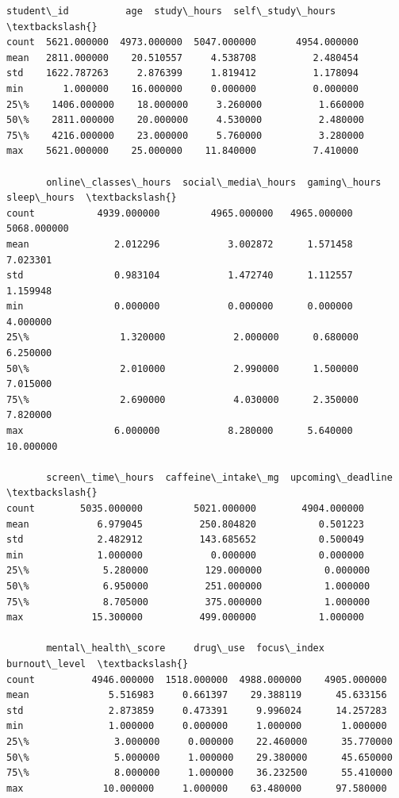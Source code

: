 \documentclass[11pt]{article}
\makeatletter
\newcommand{\boxspacing}{\kern\kvtcb@left@rule\kern\kvtcb@boxsep}
\newcommand{\prompt}[4]{
        {\ttfamily\llap{{\color{#2}[#3]:\hspace{3pt}#4}}\vspace{-\baselineskip}}
    }
\makeatother
\begin{document}
            \begin{tcolorbox}[breakable, size=fbox, boxrule=.5pt, pad at break*=1mm, opacityfill=0]
\prompt{Out}{outcolor}{4}{\boxspacing}
\begin{Verbatim}[commandchars=\\\{\}]
        student\_id          age  study\_hours  self\_study\_hours  \textbackslash{}
count  5621.000000  4973.000000  5047.000000       4954.000000
mean   2811.000000    20.510557     4.538708          2.480454
std    1622.787263     2.876399     1.819412          1.178094
min       1.000000    16.000000     0.000000          0.000000
25\%    1406.000000    18.000000     3.260000          1.660000
50\%    2811.000000    20.000000     4.530000          2.480000
75\%    4216.000000    23.000000     5.760000          3.280000
max    5621.000000    25.000000    11.840000          7.410000

       online\_classes\_hours  social\_media\_hours  gaming\_hours  sleep\_hours  \textbackslash{}
count           4939.000000         4965.000000   4965.000000  5068.000000
mean               2.012296            3.002872      1.571458     7.023301
std                0.983104            1.472740      1.112557     1.159948
min                0.000000            0.000000      0.000000     4.000000
25\%                1.320000            2.000000      0.680000     6.250000
50\%                2.010000            2.990000      1.500000     7.015000
75\%                2.690000            4.030000      2.350000     7.820000
max                6.000000            8.280000      5.640000    10.000000

       screen\_time\_hours  caffeine\_intake\_mg  upcoming\_deadline  \textbackslash{}
count        5035.000000         5021.000000        4904.000000
mean            6.979045          250.804820           0.501223
std             2.482912          143.685652           0.500049
min             1.000000            0.000000           0.000000
25\%             5.280000          129.000000           0.000000
50\%             6.950000          251.000000           1.000000
75\%             8.705000          375.000000           1.000000
max            15.300000          499.000000           1.000000

       mental\_health\_score     drug\_use  focus\_index  burnout\_level  \textbackslash{}
count          4946.000000  1518.000000  4988.000000    4905.000000
mean              5.516983     0.661397    29.388119      45.633156
std               2.873859     0.473391     9.996024      14.257283
min               1.000000     0.000000     1.000000       1.000000
25\%               3.000000     0.000000    22.460000      35.770000
50\%               5.000000     1.000000    29.380000      45.650000
75\%               8.000000     1.000000    36.232500      55.410000
max              10.000000     1.000000    63.480000      97.580000


\end{Verbatim}
\end{tcolorbox}
\end{document}
